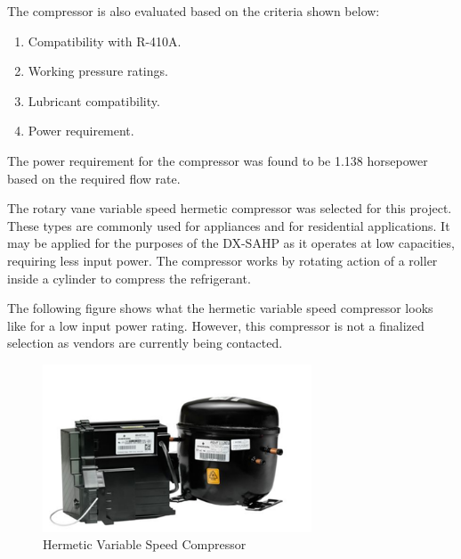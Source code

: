 \medskip
The compressor is also evaluated based on the criteria shown below:

\medskip
\begin{enumerate}[itemsep=3mm, parsep=-1mm, label=\roman*.]
    \item Compatibility with R-410A.
    \item Working pressure ratings.
    \item Lubricant compatibility.
    \item Power requirement.
\end{enumerate}

\medskip
The power requirement for the compressor was found to be 1.138 horsepower based on the required flow rate.

\medskip
The rotary vane variable speed hermetic compressor was selected for this project. These types are commonly used for appliances and for residential applications. It may be applied for the purposes of the DX-SAHP as it operates at low capacities, requiring less input power. The compressor works by rotating action of a roller inside a cylinder to compress the refrigerant.

\medskip
The following figure shows what the hermetic variable speed compressor looks like for a low input power rating. However, this compressor is not a finalized selection as vendors are currently being contacted.

\newpage
\begin{figure}[H]
    \centering
    \includegraphics[width=8cm]{images/var_speed_compressor.png}
    \caption{Hermetic Variable Speed Compressor \cite{variable_speed_drives}}
\end{figure}

